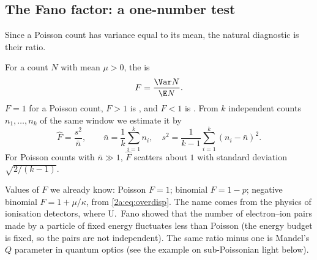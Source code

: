 \subsection{The Fano factor: a one-number test}

Since a Poisson count has variance equal to its mean, the natural diagnostic is their ratio.

\begin{workdef}
For a count $N$ with mean $\mu>0$, the  is
\[
  F=\frac{\Var N}{\E N} .
\]
$F=1$ for a Poisson count, $F>1$ is  , and $F<1$ is  . From $k$ independent counts $n_1,\dots,n_k$ of the same window we estimate it by
\[
  \hat F=\frac{s^2}{\bar n},\qquad \bar n=\frac1k\sum_{i=1}^kn_i,\quad s^2=\frac1{k-1}\sum_{i=1}^k(n_i-\bar n)^2 .
\]
For Poisson counts with $\bar n\gg1$, $\hat F$ scatters about $1$ with standard deviation $\sqrt{2/(k-1)}$.
\end{workdef}

Values of $F$ we already know: Poisson $F=1$; binomial $F=1-p$; negative binomial $F=1+\mu/\kappa$, from \eqref{2a:eq:overdisp}. The name comes from the physics of ionisation detectors, where U.~Fano showed that the number of electron--ion pairs made by a particle of fixed energy fluctuates less than Poisson (the energy budget is fixed, so the pairs are not independent). The same ratio minus one is Mandel's $Q$ parameter in quantum optics (see the example on sub-Poissonian light below).

